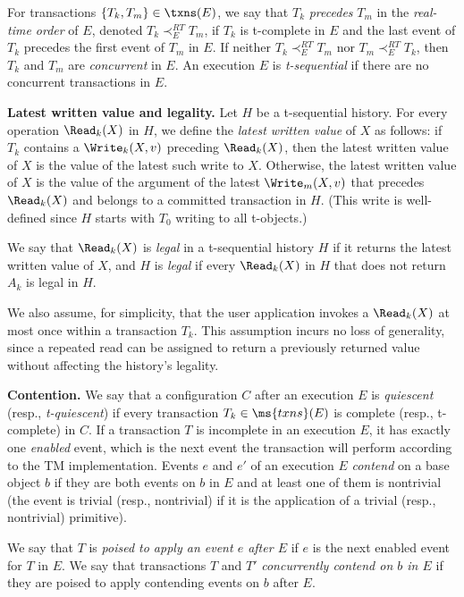 For transactions $\{T_k,T_m\} \in \txns(E)$, we say that $T_k$ \emph{precedes}
$T_m$ in the \emph{real-time order} of $E$, denoted $T_k\prec_E^{RT} T_m$,
if $T_k$ is t-complete in $E$ and
the last event of $T_k$ precedes the first event of $T_m$ in $E$.
If neither $T_k\prec_E^{RT} T_m$ nor $T_m\prec_E^{RT} T_k$,
then $T_k$ and $T_m$ are \emph{concurrent} in $E$.
An execution $E$ is \emph{t-sequential} if there are no concurrent
transactions in $E$.

\vspace{1mm}\noindent\textbf{Latest written value and legality.}
Let $H$ be a t-sequential history.
For every operation $\Read_k(X)$ in $H$,
we define the \emph{latest written value} of $X$ as follows:
if $T_k$ contains a $\Write_k(X,v)$ preceding $\Read_k(X)$,
then the latest written value of $X$ is the value of the latest such write to $X$.
Otherwise,
the latest written value of $X$ is the value
of the argument of the latest $\Write_m(X,v)$ that precedes
$\Read_k(X)$ and belongs to a committed transaction in $H$.
(This write is well-defined since $H$ starts with $T_0$ writing to
all t-objects.)

We say that $\Read_k(X)$ is \emph{legal} in a t-sequential history $H$ 
if it returns the latest written value of $X$, and $H$ is \emph{legal}
if every $\Read_k(X)$ in $H$ that does not return $A_k$ is legal in $H$.

We also assume, for simplicity, that the user application invokes a $\Read_k(X)$
at most once within a transaction $T_k$.
This assumption incurs no loss of generality,
since a repeated read can be assigned to return a previously returned
value without affecting the history's legality.

\vspace{1mm}\noindent\textbf{Contention.}
We say that a configuration $C$ after an execution $E$ is \emph{quiescent} (resp., \emph{t-quiescent})
if every transaction $T_k \in \ms{txns}(E)$ is complete (resp., t-complete) in $C$.
If a transaction $T$ is incomplete in an execution $E$, it has exactly one \emph{enabled} event, 
which is the next event the transaction will perform according to the TM implementation.
Events $e$ and $e'$ of an execution $E$  \emph{contend} on a base
object $b$ if they are both events on $b$ in $E$ and at least 
one of them is nontrivial (the event is trivial (resp., nontrivial) 
if it is the application of a trivial (resp., nontrivial) primitive).


We say that $T$ is \emph{poised to apply an event $e$ after $E$} if $e$ is the next enabled event for $T$ in $E$.
We say that transactions $T$ and $T'$ \emph{concurrently contend on $b$ in $E$} 
if they are poised to apply contending events on $b$ after $E$.

